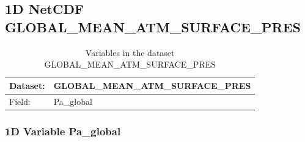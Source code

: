 \pagebreak
\subsection{1D NetCDF GLOBAL\_MEAN\_ATM\_SURFACE\_PRES}
\newp
\begin{longtable}{|p{}|p{}|}
\caption{Variables in the dataset GLOBAL\_MEAN\_ATM\_SURFACE\_PRES}
\label{tab:table-GLOBAL_MEAN_ATM_SURFACE_PRES-fields} \\ 
\hline \endhead \hline \endfoot
\rowcolor{lightgray} \textbf{Dataset:} & \textbf{GLOBAL\_MEAN\_ATM\_SURFACE\_PRES} \\ \hline
Field: &Pa\_global \\ \hline
\end{longtable}

\pagebreak
\subsubsection{1D Variable Pa\_global}
